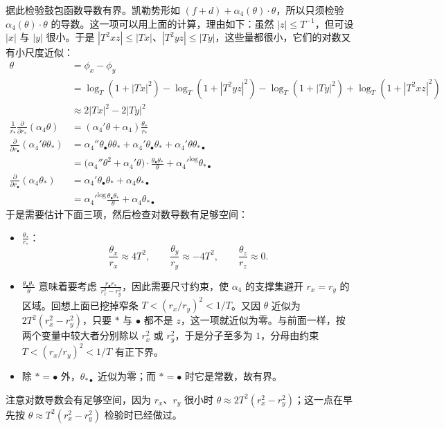 
据此检验鼓包函数导数有界。凯勒势形如 $(f+d)+\alpha_4(\theta)\cdot\theta$，所以只须检验 $\alpha_4(\theta)\cdot\theta$ 的导数。这一项可以用上面的计算，理由如下：虽然 $|z|\le T^{-1}$，但可设 $|x|$ 与 $|y|$ 很小。于是 $|T^2xz|\le|Tx|$、$|T^2yz|\le|Ty|$，这些量都很小，它们的对数又有小尺度近似：
\begin{align*}
\theta&=\phi_x-\phi_y\\
&=\log_T(1+|Tx|^2)-\log_T(1+|T^2yz|^2)-\log_T(1+|Ty|^2)+\log_T(1+|T^2xz|^2)\\
&\approx2|Tx|^2-2|Ty|^2\\
\frac{1}{r_*}\frac{\partial}{\partial r_*}(\alpha_4\theta)&=(\alpha_4'\theta+\alpha_4)\frac{\theta_*}{r_*}\\
\frac{\partial}{\partial r_\bullet}(\alpha_4'\theta\theta_*)
&=\alpha_4''\theta_\bullet\theta\theta_*+\alpha_4'\theta_\bullet\theta_*+\alpha_4'\theta\theta_{*\bullet}\\
&=\big(\alpha_4''\theta^2+\alpha_4'\theta\big)\cdot\frac{\theta_\bullet\theta_*}{\theta}
+{\alpha_4'}^{\log}\theta_{*\bullet}\\
\frac{\partial}{\partial r_\bullet}(\alpha_4\theta_*)
&=\alpha_4'\theta_\bullet\theta_*+\alpha_4\theta_{*\bullet}\\
&={\alpha_4'}^{\log}\frac{\theta_\bullet\theta_*}{\theta}+\alpha_4\theta_{*\bullet}
\end{align*}
于是需要估计下面三项，然后检查对数导数有足够空间：
\begin{itemize}[leftmargin=2.2em,itemsep=0.25em]
\item $\frac{\theta_*}{r_*}$：
\[
\frac{\theta_x}{r_x}\approx4T^2,\qquad \frac{\theta_y}{r_y}\approx-4T^2,\qquad \frac{\theta_z}{r_z}\approx0.
\]
\item $\frac{\theta_\bullet\theta_*}{\theta}$ 意味着要考虑 $\frac{r_\bullet r_*}{r_x^2-r_y^2}$，因此需要尺寸约束，使 $\alpha_4$ 的支撑集避开 $r_x=r_y$ 的区域。回想上面已挖掉窄条 $T<(r_x/r_y)^2<1/T$。又因 $\theta$ 近似为 $2T^2(r_x^2-r_y^2)$，只要 $*$ 与 $\bullet$ 都不是 $z$，这一项就近似为零。与前面一样，按两个变量中较大者分别除以 $r_x^2$ 或 $r_y^2$，于是分子至多为 $1$，分母由约束 $T<(r_x/r_y)^2<1/T$ 有正下界。
\item 除 $*=\bullet$ 外，$\theta_{*\bullet}$ 近似为零；而 $*=\bullet$ 时它是常数，故有界。
\end{itemize}
注意对数导数会有足够空间，因为 $r_x$、$r_y$ 很小时 $\theta\approx2T^2(r_x^2-r_y^2)$；这一点在早先按 $\theta\approx T^2(r_x^2-r_y^2)$ 检验时已经做过。
